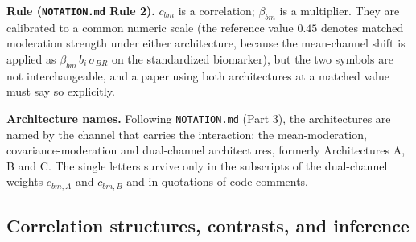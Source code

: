 \documentclass[11pt]{article}
\newcommand{\code}[1]{\texttt{#1}}
\begin{document}
\textbf{Rule (\code{NOTATION.md} Rule 2).} $c_{bm}$ is a correlation;
$\beta_{bm}$ is a multiplier. They are calibrated to a common numeric
scale (the reference value $0.45$ denotes matched moderation strength
under either architecture, because the mean-channel shift is applied
as $\beta_{bm}\, b_i\, \sigma_{BR}$ on the standardized biomarker),
but the two symbols are not interchangeable, and a paper using both
architectures at a matched value must say so explicitly.

\textbf{Architecture names.} Following \code{NOTATION.md} (Part 3),
the architectures are named by the channel that carries the
interaction: the mean-moderation, covariance-moderation and
dual-channel architectures, formerly Architectures A, B and C. The
single letters survive only in the subscripts of the dual-channel
weights $c_{bm,A}$ and $c_{bm,B}$ and in quotations of code comments.

\subsection{Correlation structures, contrasts, and inference}
\label{sec:notation-inference}
\end{document}
